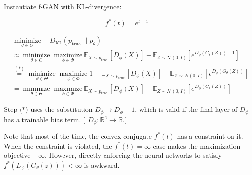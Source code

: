 \documentclass{report}
\begin{document}
\begin{concept}
    Instantiate f-GAN with KL-divergence: 

    $$
    f^{*}(t)=e^{t-1}
    $$

    $$
    \begin{aligned}
    & \underset{\theta \in \Theta}{\operatorname{minimize}} \quad D_{\mathrm{KL}}\left(p_{\text {true }} \| p_{\theta}\right) \\
    & \approx \underset{\theta \in \Theta}{\operatorname{minimize}} \underset{\phi \in \Phi}{\operatorname{maximize}} \mathbb{E}_{X \sim p_{\text {true }}}\left[D_{\phi}(X)\right]-\mathbb{E}_{Z \sim \mathcal{N}(0, I)}\left[e^{D_{\phi}\left(G_{\theta}(Z)\right)-1}\right] \\
    & \stackrel{(*)}{=} \underset{\theta \in \Theta}{\operatorname{minimize}} \underset{\phi \in \Phi}{\operatorname{maximize}} 1+\mathbb{E}_{X \sim p_{\text {true }}}\left[D_{\phi}(X)\right]-\mathbb{E}_{Z \sim \mathcal{N}(0, I)}\left[e^{D_{\phi}\left(G_{\theta}(Z)\right)}\right] \\
    & =\underset{\theta \in \Theta}{\operatorname{minimize}} \underset{\phi \in \Phi}{\operatorname{maximize}} \mathbb{E}_{X \sim p_{\text {true }}}\left[D_{\phi}(X)\right]-\mathbb{E}_{Z \sim \mathcal{N}(0, I)}\left[e^{D_{\phi}\left(G_{\theta}(Z)\right)}\right]
    \end{aligned}
    $$

    Step (*) uses the substitution $D_{\phi} \mapsto D_{\phi}+1$, which is valid if the final layer of $D_{\phi}$ has a trainable bias term. ( $D_{\phi}: \mathbb{R}^{n} \rightarrow \mathbb{R}$.)
\end{concept}

Note that most of the time, the convex conjugate $f^{*}(t)$ has a constraint on it.
When the constraint is violated, the $f^{*}(t)=\infty$ case makes the maximization objective $-\infty$.
However, directly enforcing the neural networks to satisfy $f^{*}(D_{\phi}\left(G_{\theta}(z)\right))<\infty$ is awkward.
\end{document}
